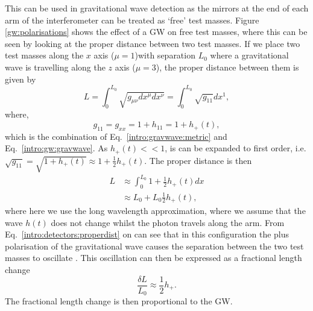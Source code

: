 This can be used in gravitational wave detection as the mirrors at the end of
each arm of the interferometer can be treated as `free' test masses.  Figure
\ref{gw:polarisations} shows the effect of a \gls{GW} on free test masses, where this can be seen by looking at the proper distance between two test masses.  If we
place two test masses along the $x$ axis ($\mu = 1$)with separation $L_0$ where a
gravitational wave is travelling along the $z$ axis ($\mu = 3$), the proper distance
between them is given by
%
\begin{equation}
    L = \int_{0}^{L_0} \sqrt{g_{\mu \nu} dx^{\mu} dx^{\nu}}= \int_{0}^{L_0} \sqrt{g_{11}} dx^1,
\end{equation}
%
where,
\begin{equation}
    \label{intro:detectors:metricpertubation}
     g_{11} = g_{xx} = 1 + h_{11} = 1 + h_{+}(t),
\end{equation}
which is the combination of Eq.~\ref{intro:gravwave:metric} and Eq.~\ref{intro:gw:gravwave}.  As $h_{+}(t) << 1$, is can be expanded to first order, i.e.  $\sqrt{g_{11}} = \sqrt{1 +
h_{+}(t)} \approx 1 + \frac{1}{2}h_{+}(t)$.  The proper distance is then
%
\begin{equation}
    \label{intro:detectors:properdist}
    \begin{split}
     L &\approx \int_{0}^{L_0} 1 + \frac{1}{2}h_{+}(t) dx \\
      &\approx L_0 + L_0 \frac{1}{2}h_{+}(t),
    \end{split}
\end{equation}
%
where here we use the long wavelength approximation, where we assume that the wave $h(t)$ does not change whilst the photon travels along the arm.
From Eq.~\ref{intro:detectors:properdist} on can see that in this configuration the
plus polarisation of the gravitational wave causes the separation between the
two test masses to oscillate \citep{flanagan2005BasicsGravitational}.  This
oscillation can then be expressed as a fractional length change
%
\begin{equation}
    \label{intro:detectors:fraclength}
    \frac{\delta L}{L_0} \approx \frac{1}{2} h_{+}.
\end{equation}
%
The fractional length change is then proportional to the \gls{GW}.


